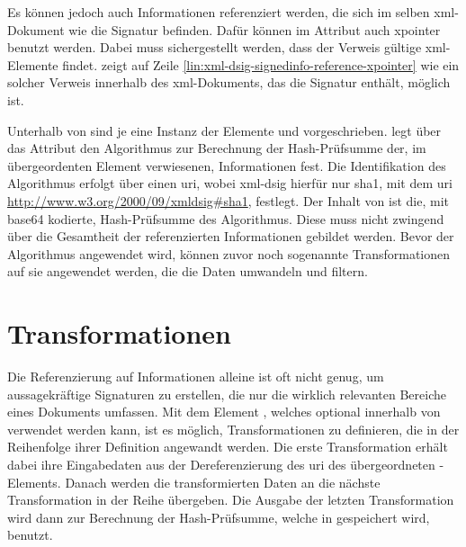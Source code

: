 

Es können jedoch auch Informationen referenziert werden, die sich im selben \gls{xml}-Dokument wie die Signatur befinden. Dafür können im Attribut
 auch \gls{xpointer} benutzt werden. Dabei muss sichergestellt werden, dass der Verweis gültige \gls{xml}-Elemente findet.
 zeigt auf Zeile \ref{lin:xml-dsig-signedinfo-reference-xpointer} wie ein solcher Verweis innerhalb des \gls{xml}-Dokuments,
das die Signatur enthält, möglich ist.

Unterhalb von  sind je eine Instanz der Elemente  und  vorgeschrieben.  legt
über das Attribut  den Algorithmus zur Berechnung der Hash-Prüfsumme der, im übergeordenten Element  verwiesenen,
Informationen fest. Die Identifikation des Algorithmus erfolgt über einen \gls{uri}, wobei \gls{xml-dsig} hierfür nur \gls{sha1}, mit dem \gls{uri}
\url{http://www.w3.org/2000/09/xmldsig#sha1}, festlegt. Der Inhalt von  ist die, mit \gls{base64} kodierte, Hash-Prüfsumme des
Algorithmus. Diese muss nicht zwingend über die Gesamtheit der referenzierten Informationen gebildet werden. Bevor der Algorithmus angewendet wird, können zuvor
noch sogenannte Transformationen auf sie angewendet werden, die die Daten umwandeln und filtern.

\section{Transformationen}
\label{sec:XML-DSig:Transformationen}
Die Referenzierung auf Informationen alleine ist oft nicht genug, um aussagekräftige Signaturen zu erstellen, die nur die wirklich relevanten Bereiche eines
Dokuments umfassen. Mit dem Element , welches optional innerhalb von  verwendet werden kann, ist es möglich,
Transformationen zu definieren, die in der Reihenfolge ihrer Definition angewandt werden. Die erste Transformation erhält dabei ihre Eingabedaten aus der
Dereferenzierung des \gls{uri} des übergeordneten -Elements. Danach werden die transformierten Daten an die nächste Transformation in der
Reihe übergeben. Die Ausgabe der letzten Transformation wird dann zur Berechnung der Hash-Prüfsumme, welche in  gespeichert wird, benutzt.

